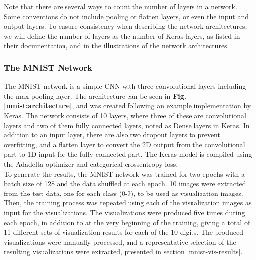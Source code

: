 \noindent Note that there are several ways to count the number of layers in a network. Some conventions do not include pooling or flatten layers, or even the input and output layers. To ensure consistency when describing the network architectures, we will define the number of layers as the number of Keras layers, as listed in their documentation, and in the illustrations of the network architectures.

\subsubsection{The MNIST Network}


The MNIST network is a simple CNN with three convolutional layers including the max pooling layer. The architecture can be seen in \textbf{Fig. \ref{mnist:architecture}}, and was created following an example implementation by Keras. The network consists of 10 layers, where three of these are convolutional layers and two of them fully connected layers, noted as Dense layers in Keras. In addition to an input layer, there are also two dropout layers to prevent overfitting, and a flatten layer to convert the 2D output from the convolutional part to 1D input for the fully connected part. The Keras model is compiled using the Adadelta optimizer and categorical crossentropy loss. \\

\noindent To generate the results, the MNIST network was trained for two epochs with a batch size of 128 and the data shuffled at each epoch. 10 images were extracted from the test data, one for each class (0-9), to be used as visualization images. Then, the training process was repeated using each of the visualization images as input for the visualizations. The visualizations were produced five times during each epoch, in addition to at the very beginning of the training, giving a total of 11 different sets of visualization results for each of the 10 digits. The produced visualizations were manually processed, and a representative selection of the resulting visualizations were extracted, presented in section \ref{mnist-vis-results}.

